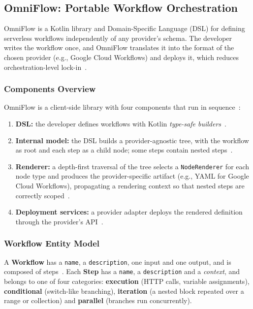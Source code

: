 \subsection{OmniFlow: Portable Workflow Orchestration}
\label{sec:background_omniflow}

OmniFlow is a Kotlin library and Domain-Specific Language (DSL) for defining serverless workflows
independently of any provider's schema. The developer writes the workflow once, and OmniFlow
translates it into the format of the chosen provider (e.g., Google Cloud Workflows) and deploys it,
which reduces orchestration-level lock-in~\cite{costa2023omniflow,silva2025advanced}.

\subsubsection{Components Overview}
OmniFlow is a client-side library with four components that run in
sequence~\cite{costa2023omniflow}:

\begin{enumerate}
	\item \textbf{DSL:} the developer defines workflows with Kotlin \emph{type-safe
	builders}~\cite{type-safe_builders}.
	\item \textbf{Internal model:} the DSL builds a provider-agnostic tree, with the workflow as root
	and each step as a child node; some steps contain nested steps~\cite{silva2025advanced}.
	\item \textbf{Renderer:} a depth-first traversal of the tree selects a \texttt{NodeRenderer} for
	each node type and produces the provider-specific artifact (e.g., YAML for Google Cloud
	Workflows), propagating a rendering context so that nested steps are correctly
	scoped~\cite{silva2025advanced}.
	\item \textbf{Deployment services:} a provider adapter deploys the rendered definition through
	the provider's API~\cite{costa2023omniflow}.
\end{enumerate}

\subsubsection{Workflow Entity Model}
A \textbf{Workflow} has a \texttt{name}, a \texttt{description}, one input and one output, and is
composed of steps~\cite{silva2025advanced}. Each \textbf{Step} has a \texttt{name}, a
\texttt{description} and a \emph{context}, and belongs to one of four categories:
\textbf{execution} (HTTP calls, variable assignments), \textbf{conditional} (switch-like
branching), \textbf{iteration} (a nested block repeated over a range or collection) and
\textbf{parallel} (branches run concurrently).

